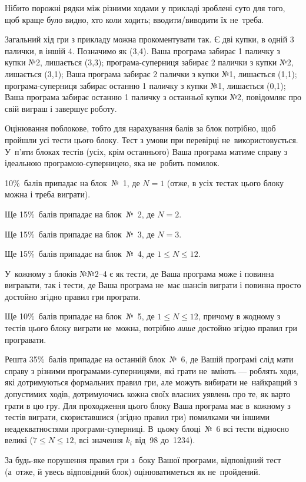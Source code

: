 \Note

Нібито порожні рядки між різними ходами у прикладі зроблені суто для того, щоб краще було видно, хто коли ходить; вводити/виводити їх не~треба.

Загальний хід гри з прикладу можна прокоментувати так. 
Є дві купки, в одній 3 палички, в іншій 4. Позначимо як (3,4).
Ваша програма забирає 1 паличку з купки №2, лишається (3,3);
програма-суперниця забирає 2 палички з купки №2, лишається (3,1);
Ваша програма забирає 2 палички з купки №1, лишається (1,1);
програма-суперниця забирає останню 1 паличку з купки №1, лишається (0,1);
Ваша програма забирає останню 1 паличку з останньої купки №2, повідомляє про свій виграш і завершує роботу.


\Scoring
Оцінювання поблокове, тобто для нарахування балів за блок потрібно, щоб пройшли усі тести цього блоку.
Тест з умови при перевірці не~використовується.
У~п'яти блоках тестів (усіх, крім останнього) Ваша програма матиме справу з ідеальною програмою-суперницею, яка не~робить помилок.

10\%~балів припадає на блок~№~1, де $N=1$ (отже, в усіх тестах цього блоку можна і треба виграти).

Ще 15\%~балів припадає на блок~№~2, де $N=2$.

Ще 15\%~балів припадає на блок~№~3, де $N=3$.

Ще 15\%~балів припадає на блок~№~4, де $1\leqslant N\leqslant 12$.

У~кожному з блоків №№2--4 є як тести, де Ваша програма може і повинна вигравати, так і тести, де Ваша програма не~має шансів виграти і повинна просто достойно згідно правил гри програти.

Ще 10\%~балів припадає на блок~№~5, де $1\leqslant N\leqslant 12$, причому в жодному з тестів цього блоку виграти не~можна, потрібно {\it лише} достойно згідно правил гри програвати.

Решта 35\%~балів припадає на останній блок~№~6, де Вашій програмі слід мати справу з різними програмами-суперницями, які грати не~вміють --- роблять ходи, які дотримуються формальних правил гри, але можуть вибирати не~найкращий з допустимих ходів, дотримуючись кожна своїх власних уявлень про те, як варто грати в цю гру. Для проходження цього блоку Ваша програма має в~кожному з тестів виграти, скориставшися (згідно правил гри) помилками чи іншими неадекватностями програми-суперниці. В~цьому блоці~№~6 всі тести відносно великі ($7\leqslant N\leqslant 12$, всі значення $k_i$ від~98 до~1234).

За будь-яке порушення правил гри з~боку Вашої програми, відповідний тест (а~отже, й увесь відповідний блок) оцінюватиметься як не~пройдений.

